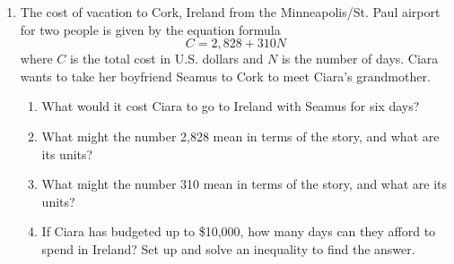 \begin{enumerate}
\item  The cost of vacation to Cork, Ireland from the Minneapolis/St. Paul airport for two people is given by the equation formula $$C = 2,828 + 310N$$ where $C$ is the total cost in U.S. dollars and $N$ is the number of days.  Ciara wants to take her boyfriend Seamus to Cork to meet Ciara's grandmother.
\begin{enumerate}
\item What would it cost Ciara to go to Ireland with Seamus for six days?
\item What might the number 2,828 mean in terms of the story, and what are its units?
\item What might the number 310 mean in terms of the story, and what are its units?
\item  If Ciara has budgeted up to \$10,000, how many days can they afford to spend in Ireland? Set up and solve an inequality to find the answer.
\end{enumerate}

\end{enumerate}


